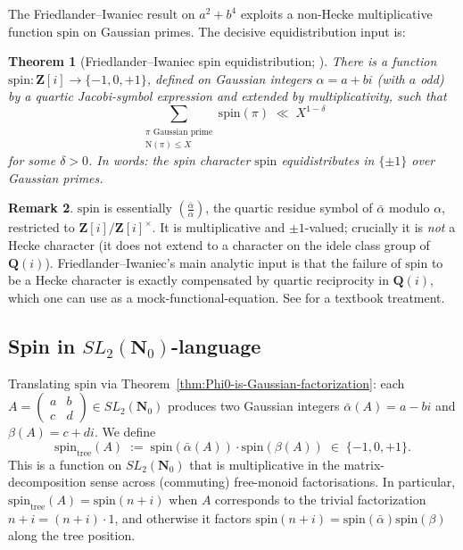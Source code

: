 \documentclass[11pt]{article}
\newtheorem{theorem}{Theorem}[section]
\theoremstyle{definition}
\newtheorem{remark}[theorem]{Remark}
\newcommand{\Nz}{\mathbf{N}_0}
\newcommand{\Z}{\mathbf{Z}}
\newcommand{\Q}{\mathbf{Q}}
\newcommand{\SLNz}{SL_2(\Nz)}
\newcommand{\Norm}{\mathrm{N}}
\newcommand{\spin}{\mathrm{spin}}
\begin{document}
The Friedlander--Iwaniec result \cite{FI98a, FI98b} on $a^2 + b^4$ exploits a non-Hecke
multiplicative function $\spin$ on Gaussian primes. The decisive equidistribution input
is:

\begin{theorem}[Friedlander--Iwaniec spin equidistribution; \cite{FI98b}]
\label{thm:FI-spin}
There is a function $\spin\colon \Z[i] \to \{-1, 0, +1\}$, defined on Gaussian integers
$\alpha = a + bi$ (with $a$ odd) by a quartic Jacobi-symbol expression and extended by
multiplicativity, such that
\[
   \sum_{\substack{\pi \text{ Gaussian prime}\\ \Norm(\pi)\le X}} \spin(\pi)
    \;\ll\; X^{1-\delta}
\]
for some $\delta > 0$. In words: the spin character $\spin$ \emph{equidistributes} in
$\{\pm 1\}$ over Gaussian primes.
\end{theorem}

\begin{remark}\label{rmk:what-spin-is}
$\spin$ is essentially $\left(\frac{\bar\alpha}{\alpha}\right)$, the quartic residue symbol
of $\bar\alpha$ modulo $\alpha$, restricted to $\Z[i]/\Z[i]^\times$. It is multiplicative
and $\pm 1$-valued; crucially it is \emph{not} a Hecke character (it does not extend to a
character on the idele class group of $\Q(i)$). Friedlander--Iwaniec's main analytic
input is that the failure of $\spin$ to be a Hecke character is exactly compensated by
quartic reciprocity in $\Q(i)$, which one can use as a mock-functional-equation. See
\cite[\S 22]{FI10} for a textbook treatment.
\end{remark}

\subsection{Spin in $\SLNz$-language}

Translating $\spin$ via Theorem~\ref{thm:Phi0-is-Gaussian-factorization}: each
$A = \left(\begin{smallmatrix} a & b \\ c & d \end{smallmatrix}\right) \in \SLNz$ produces
two Gaussian integers $\bar\alpha(A) = a - bi$ and $\beta(A) = c + di$. We define
\[
  \spin_{\mathrm{tree}}(A) \;:=\; \spin(\bar\alpha(A))\cdot\spin(\beta(A)) \;\in\; \{-1, 0, +1\}.
\]
This is a function on $\SLNz$ that is multiplicative in the matrix-decomposition sense
across (commuting) free-monoid factorisations. In particular,
$\spin_{\mathrm{tree}}(A) = \spin(n+i)$ when $A$ corresponds to the trivial factorization
$n+i = (n+i)\cdot 1$, and otherwise it factors $\spin(n+i) = \spin(\bar\alpha)\spin(\beta)$
along the tree position.
\end{document}
